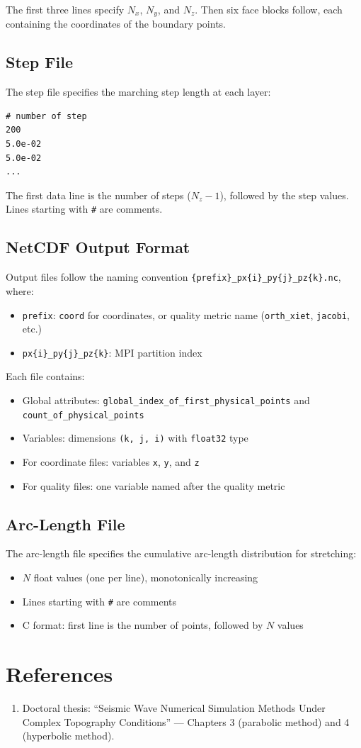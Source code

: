 \documentclass[11pt,a4paper]{report}
\begin{document}
The first three lines specify $N_x$, $N_y$, and $N_z$. Then six face blocks follow, each containing the coordinates of the boundary points.

\section{Step File}

The step file specifies the marching step length at each layer:
\begin{lstlisting}[language={}]
# number of step
200
5.0e-02
5.0e-02
...
\end{lstlisting}

The first data line is the number of steps ($N_z - 1$), followed by the step values. Lines starting with \texttt{\#} are comments.

\section{NetCDF Output Format}

Output files follow the naming convention \texttt{\{prefix\}\_px\{i\}\_py\{j\}\_pz\{k\}.nc}, where:
\begin{itemize}
    \item \texttt{prefix}: \texttt{coord} for coordinates, or quality metric name (\texttt{orth\_xiet}, \texttt{jacobi}, etc.)
    \item \texttt{px\{i\}\_py\{j\}\_pz\{k\}}: MPI partition index
\end{itemize}

Each file contains:
\begin{itemize}
    \item Global attributes: \texttt{global\_index\_of\_first\_physical\_points} and \texttt{count\_of\_physical\_points}
    \item Variables: dimensions \texttt{(k, j, i)} with \texttt{float32} type
    \item For coordinate files: variables \texttt{x}, \texttt{y}, and \texttt{z}
    \item For quality files: one variable named after the quality metric
\end{itemize}

\section{Arc-Length File}

The arc-length file specifies the cumulative arc-length distribution for stretching:
\begin{itemize}
    \item $N$ float values (one per line), monotonically increasing
    \item Lines starting with \texttt{\#} are comments
    \item C format: first line is the number of points, followed by $N$ values
\end{itemize}

\chapter*{References}

\begin{enumerate}
    \item Doctoral thesis: ``Seismic Wave Numerical Simulation Methods Under Complex Topography Conditions'' --- Chapters 3 (parabolic method) and 4 (hyperbolic method).
\end{enumerate}
\end{document}

